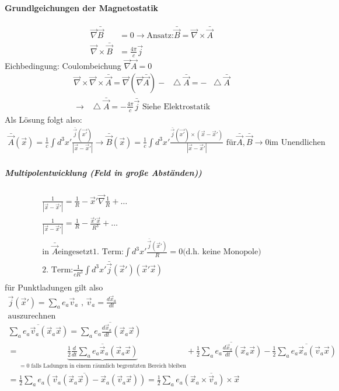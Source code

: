 \documentclass[a4paper]{article}
\newcommand*\laplace{\mathop{}\!\mathbin\bigtriangleup}
\begin{document}
\paragraph{Grundlgeichungen der Magnetostatik}
\begin{align}
\vec{\nabla}\bar{\vec{B}}&=0 \rightarrow \text{Ansatz:
}\bar{\vec{B}}=\vec{\nabla}\times \bar{\vec{A}}\\
\vec{\nabla}\times\bar{\vec{B}}&=\frac{4\pi}{c}\vec{j}
\end{align}
Eichbedingung: Coulombeichung $\vec{\nabla}\vec{A}=0$
\begin{align}
\vec{\nabla}\times\vec{\nabla}\times\bar{\vec{A}}=\vec{\nabla}(
\vec{\nabla}\bar{\vec{A}})-\laplace \bar{\vec{A}}=-\laplace \bar{\vec{A}}\\
\rightarrow \laplace \bar{\vec{A}}=-\frac{4\pi}{c}\bar{\vec{j}} \text{ Siehe
Elektrostatik}
\end{align}
Als Lösung folgt also:
\begin{align}
\bar{\vec{A}}(\vec{x})=\frac{1}{c}\int d^3x' \frac{\bar{\vec{j}}(\vec{x'})}
{|\vec{x}-\vec{x}'|}
\rightarrow \bar{\vec{B}}(\vec{x})=\frac{1}{c}\int d^3x'
\frac{\bar{\vec{j}}(\vec{x'})\times\left( \vec{x}-\vec{x}' \right)}
{|\vec{x}-\vec{x}'|} \text{  für} \bar{\vec{A}},\bar{\vec{B}}\rightarrow 0\text{
im Unendlichen}
\end{align}
\subparagraph{Multipolentwicklung (Feld in große Abständen))}
\begin{align}
\frac{1}{|\vec{x}-\vec{x}'|}=\frac{1}{R}-\vec{x}'\vec{\nabla}\frac{1}{R}+\ldots\\
\frac{1}{|\vec{x}-\vec{x}'|}=\frac{1}{R}-\frac{\vec{x}'\vec{x}}{R^3}+\ldots\\
\text{in }\bar{\vec{A}} \text{eingesetzt}
\text{1. Term:} \int d^3 x' \frac{\bar{\vec{j}}(\vec{x}')}{R}=0
\text{(d.h. keine Monopole)}\\
\text{2. Term:} \frac{1}{cR^3}\int d^3 x'\bar{\vec{j}}(\vec{x}')(\vec{x}'\vec{x})\\
\end{align}
für Punktladungen gilt also
\begin{align}
\vec{j}(\vec{x}')=\sum_a e_a \vec{v}_a \text{ , }
\vec{v}_a=\frac{d\vec{x}_a}{dt}\\
\text{auszurechnen}\\
\overline{\sum_a e_a \vec{v}_a(\vec{x}_a\vec{x})}=\overline{\sum_a e_a
\frac{d\vec{x}_a}{dt}(\vec{x}_a\vec{x})}\\
=\underbrace{\overline{\frac{1}{2}\frac{d}{dt}\sum_a e_a
\vec{x}_a(\vec{x}_a\vec{x})}}_{=0 \text{ falls Ladungen in einem räumlich
begrentzten Bereich bleiben}} +\frac{1}{2}\overline{\sum_a e_a
\frac{d\vec{x}_a}{dt}(\vec{x}_a\vec{x})}-\frac{1}{2}\overline{\sum_a e_a \vec{x}_a
(\vec{v}_a\vec{x})}\\
=\frac{1}{2}\overline{\sum_a e_a \left( \vec{v}_a
(\vec{x}_a\vec{x})-\vec{x}_a
(\vec{v}_a\vec{x}) \right)}=\frac{1}{2}\sum_a e_a \overline{\left(
\vec{x}_a\times\vec{v}_a \right)\times\vec{x}}
\end{align}
\end{document}
